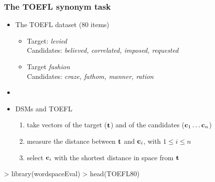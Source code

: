 \documentclass[t]{beamer} %
\begin{document}
\begin{frame}[fragile]
  \frametitle{The TOEFL synonym task}

  \begin{itemize}
  \item The TOEFL dataset (80 items)
    \begin{itemize}
    \item Target: \emph{levied}\\
      Candidates: \emph{believed, correlated, \alert<2->{imposed}, requested}
    \item<3-> Target \emph{fashion}\\
      Candidates: \emph{craze, fathom, \alert<4->{manner}, ration}
    \end{itemize}
  \item[]
  \item<5-> DSMs and TOEFL
    \begin{enumerate}
    \item take vectors of the target ($\Vector{t}$) and of the candidates
      ($\Vector{c}_1 \dots \Vector{c}_n$)
    \item measure the distance between $\Vector{t}$ and $\Vector{c}_i$, with
      $1 \leq i \leq n$ 
    \item select $\Vector{c}_i$ with the shortest distance in space from $\Vector{t}$
    \end{enumerate}
  \end{itemize}

\begin{Rcode}
> library(wordspaceEval)
> head(TOEFL80)    
\end{Rcode}
\end{frame}
\end{document}
